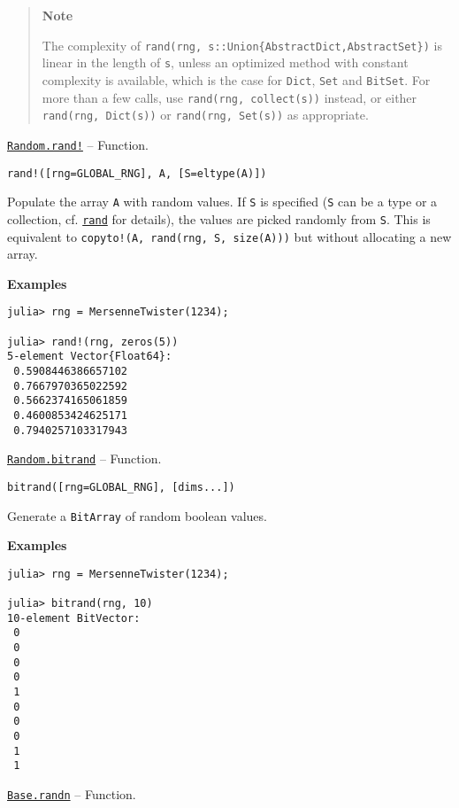 \begin{adjustwidth}{2em}{0pt}
\begin{quote}
\textbf{Note}

The complexity of \texttt{rand(rng, s::Union\{AbstractDict,AbstractSet\})} is linear in the length of \texttt{s}, unless an optimized method with constant complexity is available, which is the case for \texttt{Dict}, \texttt{Set} and \texttt{BitSet}. For more than a few calls, use \texttt{rand(rng, collect(s))} instead, or either \texttt{rand(rng, Dict(s))} or \texttt{rand(rng, Set(s))} as appropriate.

\end{quote}


\end{adjustwidth}
\hypertarget{7078395971362144272}{}
\hyperlink{7078395971362144272}{\texttt{Random.rand!}}  -- {Function.}

\begin{adjustwidth}{2em}{0pt}


\begin{verbatim}
rand!([rng=GLOBAL_RNG], A, [S=eltype(A)])
\end{verbatim}

Populate the array \texttt{A} with random values. If \texttt{S} is specified (\texttt{S} can be a type or a collection, cf. \hyperlink{7668863842145012694}{\texttt{rand}} for details), the values are picked randomly from \texttt{S}. This is equivalent to \texttt{copyto!(A, rand(rng, S, size(A)))} but without allocating a new array.

\textbf{Examples}


\begin{verbatim}
julia> rng = MersenneTwister(1234);

julia> rand!(rng, zeros(5))
5-element Vector{Float64}:
 0.5908446386657102
 0.7667970365022592
 0.5662374165061859
 0.4600853424625171
 0.7940257103317943
\end{verbatim}



\end{adjustwidth}
\hypertarget{6994846923428691074}{}
\hyperlink{6994846923428691074}{\texttt{Random.bitrand}}  -- {Function.}

\begin{adjustwidth}{2em}{0pt}


\begin{verbatim}
bitrand([rng=GLOBAL_RNG], [dims...])
\end{verbatim}

Generate a \texttt{BitArray} of random boolean values.

\textbf{Examples}


\begin{verbatim}
julia> rng = MersenneTwister(1234);

julia> bitrand(rng, 10)
10-element BitVector:
 0
 0
 0
 0
 1
 0
 0
 0
 1
 1
\end{verbatim}



\end{adjustwidth}
\hypertarget{7347069443766288058}{}
\hyperlink{7347069443766288058}{\texttt{Base.randn}}  -- {Function.}

